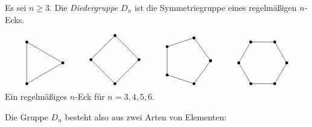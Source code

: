Es sei $n \geq 3$.
Die \emph{Diedergruppe} $D_n$ ist die Symmetriegruppe eines regelmäßigen $n$-Ecks.
\begin{center}
  \[
    \begin{tikzpicture}
      \draw (0:1)
      \foreach \x in {120, 240, 360} {
        -- (\x:1)
      };
      \foreach \x in {120, 240, 360} {
        \fill[black] (\x:1) circle (0.06);
      }
    \end{tikzpicture}
    \hspace{3em}
    \begin{tikzpicture}
      \draw (0:1)
      \foreach \x in {90, 180, 270, 360} {
        -- (\x:1)
      };
      \foreach \x in {90, 180, 270, 360} {
        \fill[black] (\x:1) circle (0.06);
      }
    \end{tikzpicture}
    \hspace{3em}
    \begin{tikzpicture}
      \draw (0:1)
      \foreach \x in {72,144,...,360} {
        -- (\x:1)
      };
      \foreach \x in {0, 72, ..., 360} {
        \fill[black] (\x:1) circle (0.06);
      }
    \end{tikzpicture}
    \hspace{3em}
    \begin{tikzpicture}
      \draw (0:1)
      \foreach \x in {60, 120, ..., 360} {
        -- (\x:1)
      };
      \foreach \x in {60, 120, ..., 360} {
        \fill[black] (\x:1) circle (0.06);
      }
    \end{tikzpicture}
  \]
  Ein regelmäßiges $n$-Eck für $n = 3, 4, 5, 6$.
\end{center}
Die Gruppe $D_n$ besteht also aus zwei Arten von Elementen:
